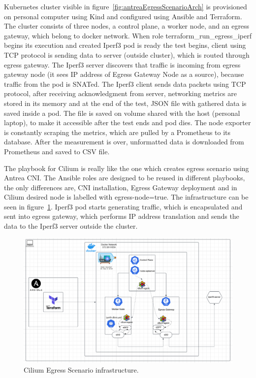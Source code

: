 Kubernetes cluster visible in figure~\ref{fig:antreaEgressScenarioArch} is provisioned on personal computer using Kind and configured using Ansible and Terraform. The cluster consists of three nodes, a control plane, a worker node, and an egress gateway, which belong to docker network. When role terraform\_run\_egress\_iperf begins its execution and created Iperf3 pod is ready the test begins, client using TCP protocol is sending data to server (outside cluster), which is routed through egress gateway. The Iperf3 server discovers that traffic is incoming from egress gateway node (it sees IP address of Egress Gateway Node as a source), because traffic from the pod is SNATed.
The Iperf3 client sends data packets using TCP protocol, after receiving acknowledgment from server, networking metrics are stored in its memory and at the end of the test, JSON file with gathered data is saved inside a pod. The file is saved on volume shared with the host (personal laptop), to make it accessible after the test ends and pod dies. The node exporter is constantly scraping the metrics, which are pulled by a Prometheus to its database. After the measurement is over, unformatted data is downloaded from Prometheus and saved to CSV file.




The playbook for Cilium is really like the one which creates egress scenario using Antrea CNI. The Ansible roles are designed to be reused in different playbooks, the only differences are, CNI installation, Egress Gateway deployment and in Cilium desired node is labelled with egress-node=true. The infrastructure can be seen in figure~\ref{fig:ciliumEgressGatewayScenarioArch}. Iperf3 pod starts generating traffic, which is encapsulated and sent into egress gateway, which performs IP address translation and sends the data to the Iperf3 server outside the cluster.

\begin{figure}[H]
  \centering
  \includegraphics[width=1\columnwidth]{images/cilium_egress_gatateway_cluster.png}
  \caption{Cilium Egress Scenario infrastructure.}
  \label{fig:ciliumEgressGatewayScenarioArch}
\end{figure}


